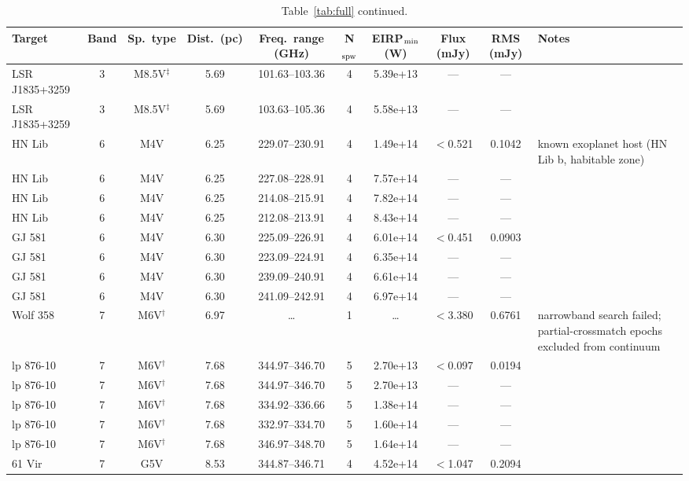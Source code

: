 \documentclass{openjournal}
\begin{document}
\begin{table}
\centering
\scriptsize
\caption{Table~\ref{tab:full} continued.}
\label{tab:full3}
\begin{tabularx}{\textwidth}{@{}l c c c c c c c c X@{}}
\hline
Target & Band & Sp.\ type & Dist.\ (pc) & Freq.\ range (GHz) & N$_{\rm spw}$ & EIRP$_{\rm min}$ (W) & Flux (mJy) & RMS (mJy) & Notes \\
\hline
LSR J1835+3259 & 3 & M8.5V$^\ddagger$ & 5.69 & 101.63--103.36 & 4 & 5.39e+13 & --- & --- &  \\
LSR J1835+3259 & 3 & M8.5V$^\ddagger$ & 5.69 & 103.63--105.36 & 4 & 5.58e+13 & --- & --- &  \\
HN Lib & 6 & M4V & 6.25 & 229.07--230.91 & 4 & 1.49e+14 & $<$0.521 & 0.1042 & known exoplanet host (HN Lib b, habitable zone) \\
HN Lib & 6 & M4V & 6.25 & 227.08--228.91 & 4 & 7.57e+14 & --- & --- &  \\
HN Lib & 6 & M4V & 6.25 & 214.08--215.91 & 4 & 7.82e+14 & --- & --- &  \\
HN Lib & 6 & M4V & 6.25 & 212.08--213.91 & 4 & 8.43e+14 & --- & --- &  \\
GJ 581 & 6 & M4V & 6.30 & 225.09--226.91 & 4 & 6.01e+14 & $<$0.451 & 0.0903 &  \\
GJ 581 & 6 & M4V & 6.30 & 223.09--224.91 & 4 & 6.35e+14 & --- & --- &  \\
GJ 581 & 6 & M4V & 6.30 & 239.09--240.91 & 4 & 6.61e+14 & --- & --- &  \\
GJ 581 & 6 & M4V & 6.30 & 241.09--242.91 & 4 & 6.97e+14 & --- & --- &  \\
Wolf  358 & 7 & M6V$^\dagger$ & 6.97 & \ldots & 1 & \ldots & $<$3.380 & 0.6761 & narrowband search failed; partial-crossmatch epochs excluded from continuum \\
lp 876-10 & 7 & M6V$^\dagger$ & 7.68 & 344.97--346.70 & 5 & 2.70e+13 & $<$0.097 & 0.0194 &  \\
lp 876-10 & 7 & M6V$^\dagger$ & 7.68 & 344.97--346.70 & 5 & 2.70e+13 & --- & --- &  \\
lp 876-10 & 7 & M6V$^\dagger$ & 7.68 & 334.92--336.66 & 5 & 1.38e+14 & --- & --- &  \\
lp 876-10 & 7 & M6V$^\dagger$ & 7.68 & 332.97--334.70 & 5 & 1.60e+14 & --- & --- &  \\
lp 876-10 & 7 & M6V$^\dagger$ & 7.68 & 346.97--348.70 & 5 & 1.64e+14 & --- & --- &  \\
61 Vir & 7 & G5V & 8.53 & 344.87--346.71 & 4 & 4.52e+14 & $<$1.047 & 0.2094 &  \\

\end{tabularx}
\end{table}
\end{document}
